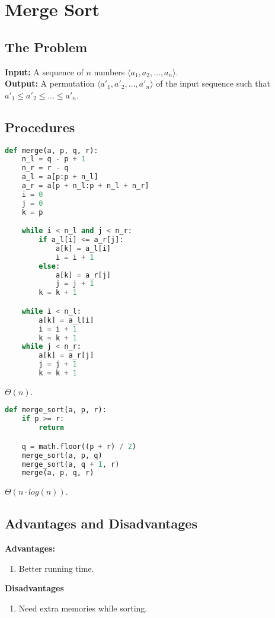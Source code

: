 \documentclass[11pt]{article}
\newcommand{\Prob}[2]{\textbf{Input:} {#1} \\ \textbf{Output:} {#2}}
\newcommand{\Arr}[1]{\langle {#1} \rangle}
\begin{document}
\section{Merge Sort}

\subsection{The Problem}

\Prob
{A sequence of $n$ numbers $\Arr{a_1,a_2,\dots,a_n}$.}
{A permutation $\Arr{a'_1,a'_2,\dots,a'_n}$ of the input sequence such that
$a'_1 \leq a'_2 \leq \dots \leq a'_n$.}

\subsection{Procedures}

\begin{lstlisting}[language=Python]
def merge(a, p, q, r):
    n_l = q - p + 1
    n_r = r - q
    a_l = a[p:p + n_l]
    a_r = a[p + n_l:p + n_l + n_r]
    i = 0
    j = 0
    k = p

    while i < n_l and j < n_r:
        if a_l[i] <= a_r[j]:
            a[k] = a_l[i]
            i = i + 1
        else:
            a[k] = a_r[j]
            j = j + 1
        k = k + 1

    while i < n_l:
        a[k] = a_l[i]
        i = i + 1
        k = k + 1
    while j < n_r:
        a[k] = a_r[j]
        j = j + 1
        k = k + 1
\end{lstlisting}

\begin{rtime*}
$\Theta(n)$.
\end{rtime*}

\begin{lstlisting}[language=Python]
def merge_sort(a, p, r):
    if p >= r:
        return

    q = math.floor((p + r) / 2)
    merge_sort(a, p, q)
    merge_sort(a, q + 1, r)
    merge(a, p, q, r)
\end{lstlisting}

\begin{rtime*}
$\Theta(n \cdot log(n))$.
\end{rtime*}

\subsection{Advantages and Disadvantages}

\textbf{Advantages:}
\begin{enumerate}
\item Better running time.
\end{enumerate}
\textbf{Disadvantages}
\begin{enumerate}
\item Need extra memories while sorting.
\end{enumerate}
\end{document}
